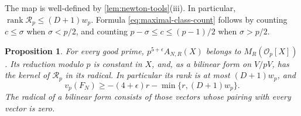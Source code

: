 \documentclass[11pt,letterpaper]{article}
\newtheorem{proposition}[proposition]{Proposition}
\theoremstyle{definition}
\DeclareMathOperator{\rank}{rank}
\begin{document}
The map is well-defined by \cref{lem:newton-tools}(iii). In particular,
$\rank\mathcal R_p\le(D+1)w_p$. Formula
\eqref{eq:maximal-class-count} follows by counting $c\le\sigma$ when
$\sigma<p/2$, and counting $p-\sigma\le c\le(p-1)/2$ when
$\sigma>p/2$.

\begin{proposition}\label{prop:local-kernel}
For every good prime, $p^{5+\epsilon}A_{N,R}(X)$ belongs to
$M_R(\mathcal O_p[X])$. Its reduction modulo $p$ is constant in $X$,
and, as a bilinear form on $V/pV$, has the kernel of $\mathcal R_p$
in its radical. In particular its rank is at most $(D+1)w_p$, and
\begin{equation}\label{eq:local-determinant-bound}
 v_p(F_N)\ge-(4+\epsilon)r-\min\{r,(D+1)w_p\}.
\end{equation}
The radical of a bilinear form consists of those vectors whose pairing
with every vector is zero.
\end{proposition}
\end{document}
